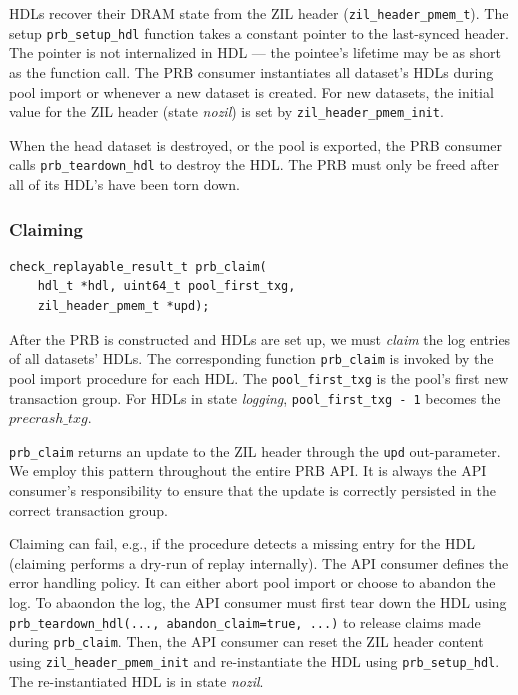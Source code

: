 \documentclass[12pt,a4paper,twoside]{book}
\begin{document}
{HDLs recover their DRAM state from the ZIL header (\lstinline{zil_header_pmem_t}).
The setup \lstinline{prb_setup_hdl} function takes a constant pointer to the last-synced header.
The pointer is not internalized in HDL --- the pointee's lifetime may be as short as the function call.
The PRB consumer instantiates all dataset's HDLs during pool import or whenever a new dataset is created.
For new datasets, the initial value for the ZIL header (state \textit{nozil}) is set by \lstinline{zil_header_pmem_init}.

When the head dataset is destroyed, or the pool is exported, the PRB consumer calls \lstinline{prb_teardown_hdl} to destroy the HDL.
The PRB must only be freed after all of its HDL's have been torn down.

\subsubsection{Claiming}\label{di:prb:api:claiming}

\begin{lstlisting}
check_replayable_result_t prb_claim(
    hdl_t *hdl, uint64_t pool_first_txg,
    zil_header_pmem_t *upd);
\end{lstlisting}

After the PRB is constructed and HDLs are set up, we must \textit{claim} the log entries of all datasets' HDLs.
The corresponding function \lstinline{prb_claim} is invoked by the pool import procedure for each HDL.
The \lstinline{pool_first_txg} is the pool's first new transaction group.
For HDLs in state \textit{logging}, \lstinline{pool_first_txg - 1} becomes the $precrash\_txg$.

\lstinline{prb_claim} returns an update to the ZIL header through the \lstinline{upd} out-parameter.
We employ this pattern throughout the entire PRB API.
It is always the API consumer's responsibility to ensure that the update is correctly persisted in the correct transaction group.

Claiming can fail, e.g., if the procedure detects a missing entry for the HDL (claiming performs a dry-run of replay internally).
The API consumer defines the error handling policy.
It can either abort pool import or choose to abandon the log.
To abaondon the log, the API consumer must first tear down the HDL using \lstinline{prb_teardown_hdl(..., abandon_claim=true, ...)} to release claims made during \lstinline{prb_claim}.
Then, the API consumer can reset the ZIL header content using \lstinline{zil_header_pmem_init} and re-instantiate the HDL using \lstinline{prb_setup_hdl}.
The re-instantiated HDL is in state \textit{nozil}.

}
\end{document}
